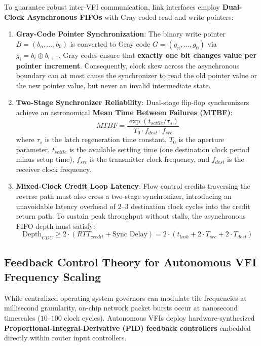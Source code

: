To guarantee robust inter-VFI communication, link interfaces employ \textbf{Dual-Clock Asynchronous FIFOs} with Gray-coded read and write pointers:
\begin{enumerate}
    \item \textbf{Gray-Code Pointer Synchronization}: The binary write pointer $B = (b_n, \dots, b_0)$ is converted to Gray code $G = (g_n, \dots, g_0)$ via $g_i = b_i \oplus b_{i+1}$. Gray codes ensure that \textbf{exactly one bit changes value per pointer increment}. Consequently, clock skew across the asynchronous boundary can at most cause the synchronizer to read the old pointer value or the new pointer value, but never an invalid intermediate state.
    \item \textbf{Two-Stage Synchronizer Reliability}: Dual-stage flip-flop synchronizers achieve an astronomical \textbf{Mean Time Between Failures (MTBF)}:
    \begin{equation}
    MTBF = \frac{\exp(t_{settle} / \tau_s)}{T_0 \cdot f_{dest} \cdot f_{src}}
    \label{eq:ch6_mtbf}
    \end{equation}
    where $\tau_s$ is the latch regeneration time constant, $T_0$ is the aperture parameter, $t_{settle}$ is the available settling time (one destination clock period minus setup time), $f_{src}$ is the transmitter clock frequency, and $f_{dest}$ is the receiver clock frequency.
    \item \textbf{Mixed-Clock Credit Loop Latency}: Flow control credits traversing the reverse path must also cross a two-stage synchronizer, introducing an unavoidable latency overhead of $2$--$3$ destination clock cycles into the credit return path. To sustain peak throughput without stalls, the asynchronous FIFO depth must satisfy:
    \begin{equation}
    \text{Depth}_{CDC} \ge 2 \cdot (RTT_{credit} + \text{Sync Delay}) = 2 \cdot (t_{link} + 2 \cdot T_{src} + 2 \cdot T_{dest})
    \label{eq:ch6_cdc_depth}
    \end{equation}
\end{enumerate}

\subsection{Feedback Control Theory for Autonomous VFI Frequency Scaling}
\label{subsec:ch6_pid_control}

While centralized operating system governors can modulate tile frequencies at millisecond granularity, on-chip network packet bursts occur at nanosecond timescales ($10\text{--}100$ clock cycles). Autonomous VFIs deploy hardware-synthesized \textbf{Proportional-Integral-Derivative (PID) feedback controllers} embedded directly within router input controllers.

